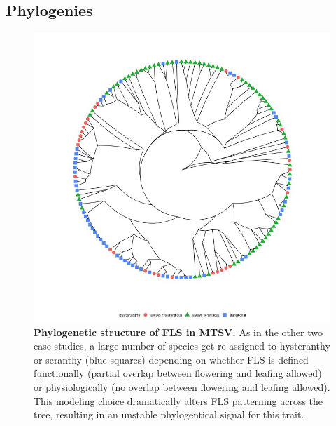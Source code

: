 \documentclass[12pt]{article}\usepackage[]{graphicx}\usepackage[]{color}
\begin{document}
\subsection*{Phylogenies}
 \begin{figure}[h!]
    \centering
    \includegraphics[width=.8\textwidth]{..//figure/michtreeplot.jpeg}
    \caption{\textbf{Phylogenetic structure of FLS in MTSV.} As in the other two case studies, a large number of species get re-assigned to hysteranthy or seranthy (blue squares) depending on whether FLS is defined functionally (partial overlap between flowering and leafing allowed) or physiologically (no overlap between flowering and leafing allowed). This modeling choice dramatically alters FLS patterning across the tree, resulting in an unstable phylogentical signal for this trait.}
    \label{fig:Figure S1}
    \end{figure}
    
\end{document}
